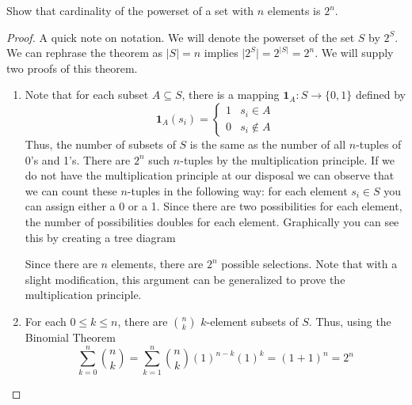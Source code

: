 \begin{exercise} \label{0.101}
	Show that cardinality of the powerset of a set with \( n \) elements is \( 2^n \).
	
	\begin{proof}
	    A quick note on notation. We will denote the powerset of the set \( S \) by \( 2^S \). We can rephrase the theorem as \( \vert S \vert = n \) implies \( \vert 2^S \vert = 2^{\vert S \vert} = 2^n \). We will supply two proofs of this theorem.
	    
	    \begin{enumerate}
	        \item Note that for each subset \( A \subseteq S \), there is a mapping \( \mathbf{1}_A: S \rightarrow \{ 0,1 \} \) defined by
	        \[ \mathbf{1}_A(s_i) = \begin{cases} 1 & s_i \in A \\ 0 & s_i \not\in A \end{cases} \]
	        Thus, the number of subsets of \( S \) is the same as the number of all \(n\)-tuples of 0's and 1's. There are \( 2^n \) such \(n\)-tuples by the multiplication principle. If we do not have the multiplication principle at our disposal we can observe that we can count these \(n\)-tuples in the following way: for each element \( s_i \in S \) you can assign either a 0 or a 1. Since there are two possibilities for each element, the number of possibilities doubles for each element. Graphically you can see this by creating a tree diagram
	        \begin{center}
	        \end{center}
	        Since there are \( n \) elements, there are \( 2^n \) possible selections. Note that with a slight modification, this argument can be generalized to prove the multiplication principle. 
	        
	        \item For each \( 0 \leq k \leq n \), there are \( {n \choose k} \) \(k\)-element subsets of \( S \). Thus, using the Binomial Theorem 
	        \[ \sum_{k=0}^n {n \choose k} = \sum_{k=1}^n {n \choose k} (1)^{n-k} (1)^k = (1+1)^n = 2^n \]
	    \end{enumerate}
	\end{proof}
\end{exercise}

